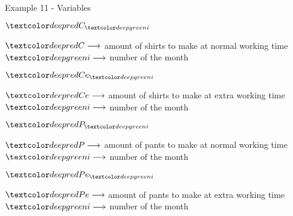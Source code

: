\begin{frame}{Example 11 - Variables}
\begin{multicols}{4}

\begin{center}
\Huge{
$\colora{C}_{\colorb{i}}$
}
\end{center}
\small{
$\colora{C} \longrightarrow$
    amount of shirts to make at normal working time \\
$\colorb{i} \longrightarrow$
    number of the month
}
\vfill
\columnbreak


\begin{center}
\Huge{
$\colora{Ce}_{\colorb{i}}$
}
\end{center}
\small{
$\colora{Ce} \longrightarrow$
    amount of shirts to make at extra working time \\
$\colorb{i} \longrightarrow$
    number of the month
}
\vfill
\columnbreak


\begin{center}
\Huge{
$\colora{P}_{\colorb{i}}$
}
\end{center}
\small{
$\colora{P} \longrightarrow$
    amount of pants to make at normal working time \\
$\colorb{i} \longrightarrow$
    number of the month
}
\vfill
\columnbreak


\begin{center}
\Huge{
$\colora{Pe}_{\colorb{i}}$
}
\end{center}
\small{
$\colora{Pe} \longrightarrow$
    amount of pants to make at extra working time \\
$\colorb{i} \longrightarrow$
    number of the month
}
\end{multicols}
\end{frame}
